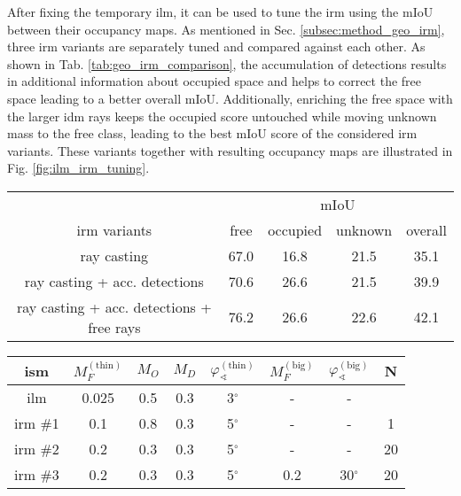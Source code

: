 After fixing the temporary \gls{ilm}, it can be used to tune the \gls{irm} using the mIoU between their occupancy maps. As mentioned in Sec. \ref{subsec:method_geo_irm}, three \gls{irm} variants are separately tuned and compared against each other. 
As shown in Tab. \ref{tab:geo_irm_comparison}, the accumulation of detections results in additional information about occupied space and helps to correct the free space leading to a better overall mIoU. Additionally, enriching the free space with the larger \gls{idm} rays keeps the occupied score untouched while moving unknown mass to the free class, leading to the best mIoU score of the considered \gls{irm} variants. These variants together with resulting occupancy maps are illustrated in Fig. \ref{fig:ilm_irm_tuning}.
\begin{center}
	\begin{tabular}{c|ccc|c}
		& \multicolumn{4}{c}{mIoU}\\
		\gls{irm} variants & free & occupied & unknown & overall \\
		\hline
		ray casting & 67.0 & 16.8 & 21.5 & 35.1\\
		ray casting + acc. detections & 70.6 & 26.6 & 21.5 & 39.9\\
		ray casting + acc. detections + free rays & 76.2 & 26.6 & 22.6 & 42.1\\		
	\end{tabular}
\end{center}
\begin{center}
	\begin{tabular}{c|c|c|c|c|c|c|c}
		\gls{ism} & $M_F^{(\text{thin})}$ & $M_O$ & $M_D$ & $\varphi_\sphericalangle^{(\text{thin})}$ & $M_F^{(\text{big})}$ & $\varphi_\sphericalangle^{(\text{big})}$ & N\\
		\hline
		\gls{ilm} & 0.025 & 0.5 & 0.3 & 3$^\circ$ & - & - \\
		\gls{irm} \#1 & 0.1 & 0.8 & 0.3 & 5$^\circ$ & - & - & 1\\
		\gls{irm} \#2& 0.2 & 0.3 & 0.3 & 5$^\circ$ & - & - & 20\\
		\gls{irm} \#3& 0.2 & 0.3 & 0.3 & 5$^\circ$ & 0.2 & 30$^\circ$ & 20 
	\end{tabular}
\end{center}
%
